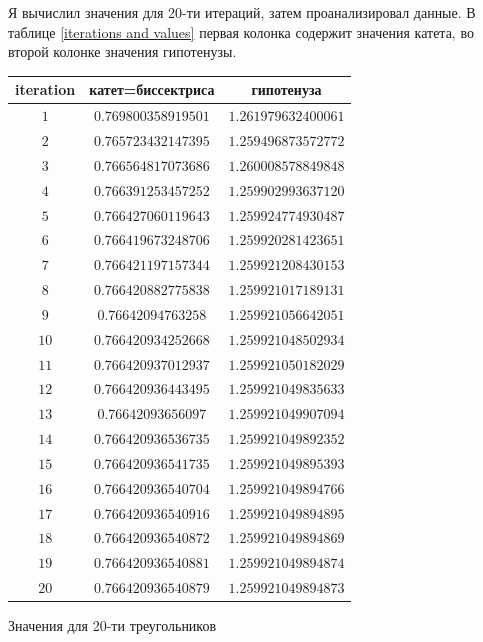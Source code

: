 \documentclass[12pt, letterpaper, oneside]{report}
\begin{document}
\newpage
Я вычислил значения для 20-ти итераций, затем проанализировал данные. В таблице \ref{iterations and values} первая колонка содержит значения катета, во второй колонке значения гипотенузы.
\\
\vspace{10pt}


\begin{tabular}{|c|c|c|} \hline
\centering
\textbf{iteration}	& \textbf{катет=биссектриса} & \textbf{гипотенуза}\\	\hline
	$1$         & $0.769800358919501$ & $1.261979632400061$ \\ \hline
	$2$         & $0.765723432147395$ & $1.259496873572772$ \\ \hline
	$3$         & $0.766564817073686$ & $1.260008578849848$ \\ \hline
	$4$         & $0.766391253457252$ & $1.259902993637120$ \\ \hline
	$5$         & $0.766427060119643$ & $1.259924774930487$ \\ \hline
	$6$         & $0.766419673248706$ & $1.259920281423651$ \\ \hline
	$7$         & $0.766421197157344$ & $1.259921208430153$ \\ \hline
	$8$         & $0.766420882775838$ & $1.259921017189131$ \\ \hline
	$9$        & $0.76642094763258$ & $1.259921056642051$ \\ \hline
	$10$        & $0.766420934252668$ & $1.259921048502934$ \\ \hline
	$11$        & $0.766420937012937$ & $1.259921050182029$ \\ \hline
	$12$        & $0.766420936443495$ & $1.259921049835633$ \\ \hline
	$13$        & $0.76642093656097$ & $1.259921049907094$ \\ \hline
	$14$        & $0.766420936536735$ & $1.259921049892352$ \\ \hline
	$15$        & $0.766420936541735$ & $1.259921049895393$ \\ \hline
	$16$        & $0.766420936540704$ & $1.259921049894766$ \\ \hline
	$17$        & $0.766420936540916$ & $1.259921049894895$ \\ \hline
	$18$        & $0.766420936540872$ & $1.259921049894869$ \\ \hline
	$19$        & $0.766420936540881$ & $1.259921049894874$ \\ \hline
	$20$        & $0.766420936540879$ & $1.259921049894873$ \\ \hline

\end{tabular} 
\begin{table}[H] %
	\caption {Значения для 20-ти треугольников}
	\label{iterations and values}
\end{table}
\end{document}
